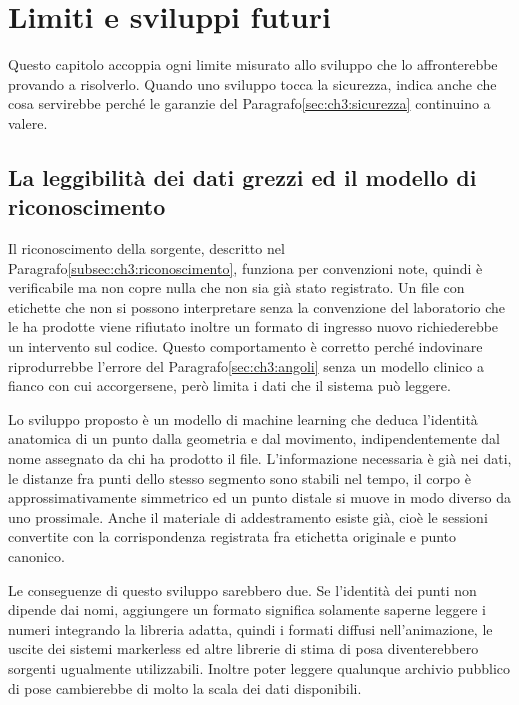 \chapter{Limiti e sviluppi futuri}
\label{chap:discussione}

Questo capitolo accoppia ogni limite misurato allo sviluppo che lo
affronterebbe provando a risolverlo. Quando uno sviluppo tocca la sicurezza, indica anche che cosa
servirebbe perché le garanzie del Paragrafo\ref{sec:ch3:sicurezza} continuino a
valere.

\section{La leggibilità dei dati grezzi ed il modello di riconoscimento}
\label{sec:ch6:ml-riconoscimento}

Il riconoscimento della sorgente, descritto nel
Paragrafo\ref{subsec:ch3:riconoscimento}, funziona per convenzioni note, quindi è
verificabile ma non copre nulla che non sia già stato registrato. Un file con
etichette che non si possono interpretare senza la convenzione del laboratorio che
le ha prodotte viene rifiutato inoltre un formato di ingresso nuovo richiederebbe un
intervento sul codice. Questo comportamento è corretto perché indovinare
riprodurrebbe l'errore del Paragrafo\ref{sec:ch3:angoli} senza un modello clinico
a fianco con cui accorgersene, però limita i dati che il sistema può leggere.

Lo sviluppo proposto è un modello di machine learning che deduca l'identità
anatomica di un punto dalla geometria e dal movimento, indipendentemente dal nome
assegnato da chi ha prodotto il file. L'informazione necessaria è già nei dati, le
distanze fra punti dello stesso segmento sono stabili nel tempo, il corpo è
approssimativamente simmetrico ed un punto distale si muove in modo diverso da uno prossimale. Anche il materiale
di addestramento esiste già, cioè le sessioni convertite con la corrispondenza
registrata fra etichetta originale e punto canonico.

Le conseguenze di questo sviluppo sarebbero due. Se l'identità dei punti non dipende dai nomi,
aggiungere un formato significa solamente saperne leggere i numeri integrando la
libreria adatta, quindi i formati diffusi nell'animazione, le uscite dei sistemi
markerless ed altre librerie di stima di posa diventerebbero sorgenti ugualmente utilizzabili.
Inoltre poter leggere qualunque archivio pubblico di pose cambierebbe di molto la scala dei
dati disponibili.

